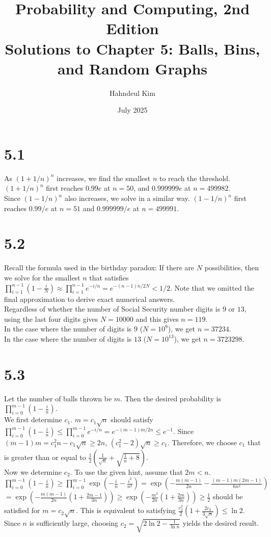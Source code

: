 \documentclass{article}
\title {Probability and Computing, 2nd Edition \\[2ex] \large Solutions to Chapter 5: Balls, Bins, and Random Graphs}
\author{Hahndeul Kim}
\date{July 2025}
\begin{document}
\maketitle
\newpage
\section*{5.1}
As $(1+1/n)^n$ increases, we find the smallest $n$ to reach the threshold.\\
$(1+1/n)^n$ first reaches $0.99e$ at $n=50$, and $0.999999e$ at $n=499982$.\\
Since $(1-1/n)^n$ also increases, we solve in a similar way. $(1-1/n)^n$ first reaches $0.99/e$ at $n=51$ and $0.999999/e$ at $n=499991$.
\section*{5.2}
Recall the formula used in the birthday paradox: If there are $N$ possibilities, then we solve for the smallest $n$ that satisfies
$\prod\limits_{i=1}^{n-1}(1-\frac{i}{N})\approx\prod\limits_{i=1}^{n-1}e^{-i/n}=e^{-(n-1)n/2N}<1/2$.
Note that we omitted the final approximation to derive exact numerical answers.\\
Regardless of whether the number of Social Security number digits is $9$ or $13$, using the last four digits gives $N=10000$ and this gives $n=119$.\\
In the case where the number of digits is $9$ ($N=10^9$), we get $n=37234$.\\
In the case where the number of digits is $13$ ($N=10^{13}$), we get $n=3723298$.
\section*{5.3}
Let the number of balls thrown be $m$. Then the desired probability is $\prod\limits_{i=0}^{m-1}(1-\frac{i}{n})$.\\
We first determine $c_1$.
$m=c_1\sqrt{n}$ should satisfy $\prod\limits_{i=0}^{m-1}(1-\frac{i}{n}) \leq \prod\limits_{i=0}^{m-1}e^{-i/n}=e^{-(m-1)m/2n}\leq e^{-1}$.
Since $(m-1)m=c_1^2n-c_1\sqrt{n}\geq 2n$, $(c_1^2-2)\sqrt{n}\geq c_1$.
Therefore, we choose $c_1$ that is greater than or equal to $\frac{1}{2}\left(\frac{1}{\sqrt{n}}+\sqrt{\frac{1}{n}+8}\right)$.\\
Now we determine $c_2$. To use the given hint, assume that $2m < n$.\\
$\prod\limits_{i=0}^{m-1}(1-\frac{i}{n})\geq\prod\limits_{i=0}^{m-1}\exp(-\frac{i}{n}-\frac{i^2}{n^2})=\exp(-\frac{m(m-1)}{2n}-\frac{(m-1)m(2m-1)}{6n^2})$\\
$=\exp(-\frac{m(m-1)}{2n}(1+\frac{2m-1}{3n}))\geq\exp(-\frac{m^2}{2n}(1+\frac{2m}{3n}))\geq \frac{1}{2}$ should be satisfied for $m=c_2\sqrt{n}$.
This is equivalent to satisfying $\frac{c_2^2}{2}(1+\frac{2c_2}{3\sqrt{n}})\leq \ln 2$.\\
Since $n$ is sufficiently large, choosing $c_2 = \sqrt{2\ln2 - \frac{1}{\ln n}}$ yields the desired result.
\end{document}
